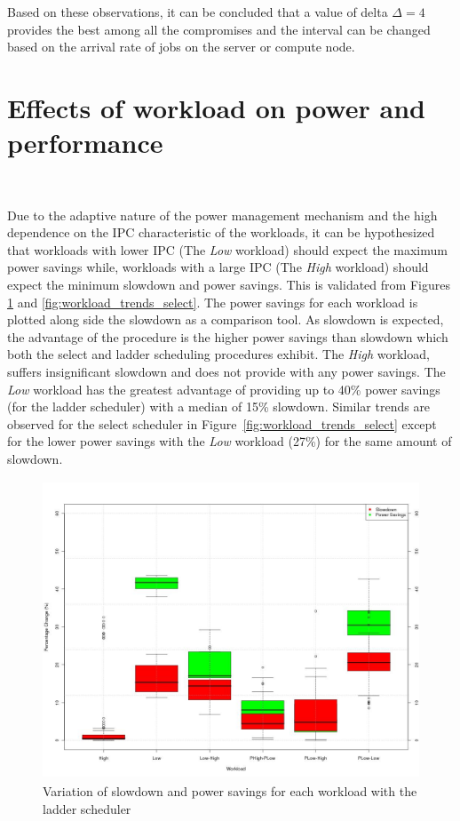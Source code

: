 Based on these observations, it can be concluded that a value of delta $\Delta = 4$ provides
the best among all the compromises and the interval can be changed based on the arrival rate
of jobs on the server or compute node.

\section{Effects of workload on power and performance}~\label{sec:wrk_trends}

Due to the adaptive nature of the power management mechanism and the high dependence
on the IPC characteristic of the workloads, it can be hypothesized
that workloads with lower IPC (The \textit{Low} workload) should expect the maximum
power savings while, workloads with a large IPC (The \textit{High} workload) should
expect the minimum slowdown and power savings. This is validated from Figures \ref{fig:workload_trends_ladder}
and \ref{fig:workload_trends_select}. The power savings for each workload is plotted
along side the slowdown as a comparison tool. As slowdown is expected, the advantage of the procedure
is the higher power savings than slowdown which both the select and ladder scheduling
procedures exhibit. The \textit{High} workload, suffers insignificant slowdown and 
does not provide with any power savings. The \textit{Low} workload has the greatest advantage
of providing up to 40\% power savings (for the ladder scheduler) with a median of 15\% slowdown.
Similar trends are observed for the select scheduler in Figure~\ref{fig:workload_trends_select} 
except for the lower power savings with the \textit{Low} workload (27\%) for the same amount of 
slowdown.

\begin{figure}[h!]
  \begin{center}
    \includegraphics[height=3.5in]{figures/trends_workload_ladder.jpg}%
    \caption{Variation of slowdown and power savings for each workload with the ladder scheduler}
    \label{fig:workload_trends_ladder}
  \end{center}
\end{figure}

